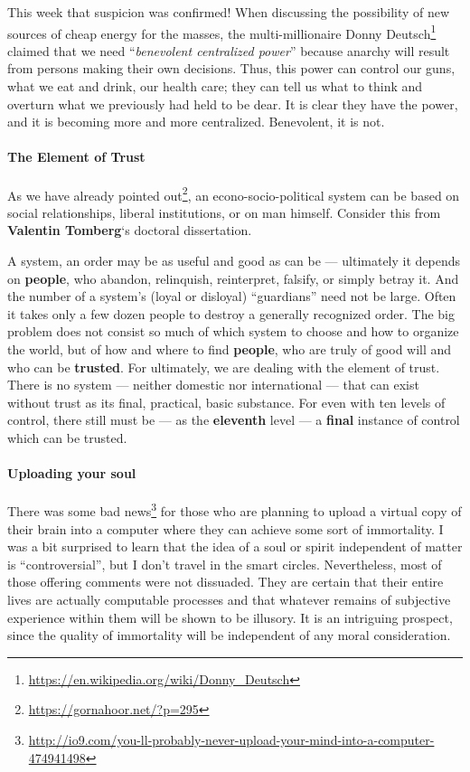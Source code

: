 This week that suspicion was confirmed! When discussing the possibility of new sources of cheap energy for the masses, the multi-millionaire Donny Deutsch\footnote{\url{https://en.wikipedia.org/wiki/Donny_Deutsch}} claimed that we need ``\emph{benevolent centralized power}'' because anarchy will result from persons making their own decisions. Thus, this power can control our guns, what we eat and drink, our health care; they can tell us what to think and overturn what we previously had held to be dear. It is clear they have the power, and it is becoming more and more centralized. Benevolent, it is not.

\paragraph{The Element of Trust}


As we have already pointed out\footnote{\url{https://gornahoor.net/?p=295}}, an econo-socio-political system can be based on social relationships, liberal institutions, or on man himself. Consider this from \textbf{Valentin Tomberg}`s doctoral dissertation.

\begin{quotex}
A system, an order may be as useful and good as can be --- ultimately it depends on \textbf{people}, who abandon, relinquish, reinterpret, falsify, or simply betray it. And the number of a system's (loyal or disloyal) ``guardians'' need not be large. Often it takes only a few dozen people to destroy a generally recognized order. The big problem does not consist so much of which system to choose and how to organize the world, but of how and where to find \textbf{people}, who are truly of good will and who can be \textbf{trusted}. For ultimately, we are dealing with the element of trust. There is no system --- neither domestic nor international --- that can exist without trust as its final, practical, basic substance. For even with ten levels of control, there still must be --- as the \textbf{eleventh} level --- a \textbf{final} instance of control which can be trusted.
\end{quotex}


\paragraph{Uploading your soul}


There was some bad news\footnote{\url{http://io9.com/you-ll-probably-never-upload-your-mind-into-a-computer-474941498}} for those who are planning to upload a virtual copy of their brain into a computer where they can achieve some sort of immortality. I was a bit surprised to learn that the idea of a soul or spirit independent of matter is ``controversial'', but I don't travel in the smart circles. Nevertheless, most of those offering comments were not dissuaded. They are certain that their entire lives are actually computable processes and that whatever remains of subjective experience within them will be shown to be illusory. It is an intriguing prospect, since the quality of immortality will be independent of any moral consideration.

